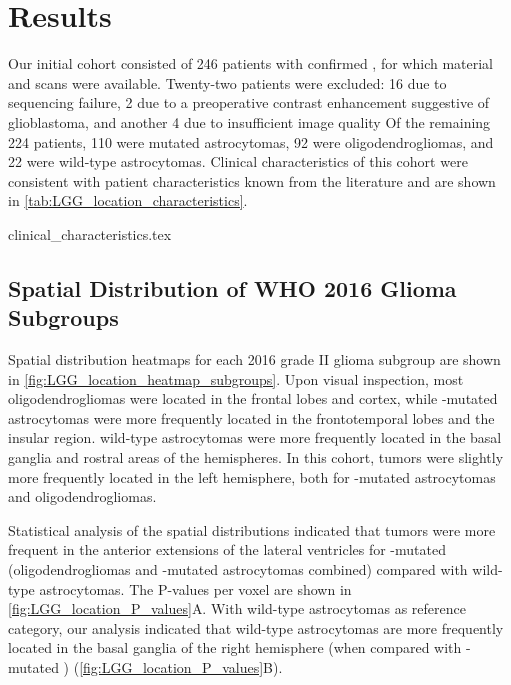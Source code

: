 \section{Results}

Our initial cohort consisted of 246 patients with confirmed , for which  material and  scans were available.
Twenty-two patients were excluded: 16 due to sequencing failure, 2 due to a preoperative contrast enhancement suggestive of glioblastoma, and another 4 due to insufficient image quality
Of the remaining 224 patients, 110 were  mutated astrocytomas, 92 were oligodendrogliomas, and 22 were  wild-type astrocytomas.
Clinical characteristics of this cohort were consistent with  patient characteristics known from the literature and are shown in \cref{tab:LGG_location_characteristics}.

{clinical_characteristics.tex}

\subsection{Spatial Distribution of WHO 2016 Glioma Subgroups}

Spatial distribution heatmaps for each  2016 grade II glioma subgroup are shown in \cref{fig:LGG_location_heatmap_subgroups}.
Upon visual inspection, most oligodendrogliomas were located in the frontal lobes and cortex, while -mutated astrocytomas were more frequently located in the frontotemporal lobes and the insular region.
 wild-type astrocytomas were more frequently located in the basal ganglia and rostral areas of the hemispheres.
In this cohort, \glspl{tumor} were slightly more frequently located in the left hemisphere, both for -mutated astrocytomas and oligodendrogliomas.

Statistical analysis of the spatial distributions indicated that \glspl{tumor} were more frequent in the anterior extensions of the lateral ventricles for -mutated  (oligodendrogliomas and -mutated astrocytomas combined) compared with  wild-type astrocytomas.
The P-values per voxel are shown in \cref{fig:LGG_location_P_values}A.
With  wild-type astrocytomas as reference category, our analysis indicated that  wild-type astrocytomas are more frequently located in the basal ganglia of the right hemisphere (when compared with -mutated ) (\cref{fig:LGG_location_P_values}B).

